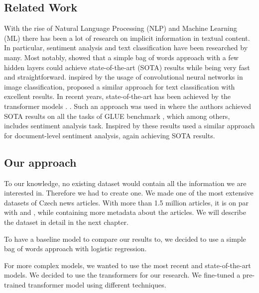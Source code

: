 \subsection*{Related Work}
With the rise of Natural Language Processing (NLP) and Machine Learning (ML)
there has been a lot of research on implicit information in textual content.
In particular, sentiment analysis and text classification have been researched by many.
Most notably, \cite{joulinBagTricksEfficient2016} showed that a simple bag of words approach
with a few hidden layers could achieve state-of-the-art (SOTA) results while being very fast and straightforward.
\cite{zhangTextUnderstandingScratch2016} inspired by the usage of convolutional neural networks in image classification,
proposed a similar approach for text classification with excellent results.
In recent years, state-of-the-art has been achieved by the transformer models \cite{vaswaniAttentionAllYou2017d}.
.
Such an approach was used in \cite{devlinBERTPretrainingDeep2019a} where the authors achieved SOTA results on
all the tasks of GLUE benchmark \cite{wangGLUEMultiTaskBenchmark2019}, which among others, includes 
sentiment analysis task. Inspired by these results \cite{adhikariDocBERTBERTDocument2019} used a similar approach for
document-level sentiment analysis, again achieving SOTA results.

\subsection*{Our approach}
To our knowledge, no existing dataset would contain all the information we are interested in.
Therefore we had to create one. We made one of the most extensive datasets of Czech news articles.
With more than 1.5 million articles, it is on par with \cite{sidoCzertCzechBERTlike2021} and \cite{zemanCzechNewsClassification2021},
while containing more metadata about the articles. We will describe the dataset in detail in the next chapter.


To have a baseline model to compare our results to, we decided to use a simple bag of words approach with logistic regression.

For more complex models, we wanted to use the most recent and state-of-the-art models.
We decided to use the transformers \cite{vaswaniAttentionAllYou2017d} for our research.
We fine-tuned a pre-trained transformer model using different techniques.

